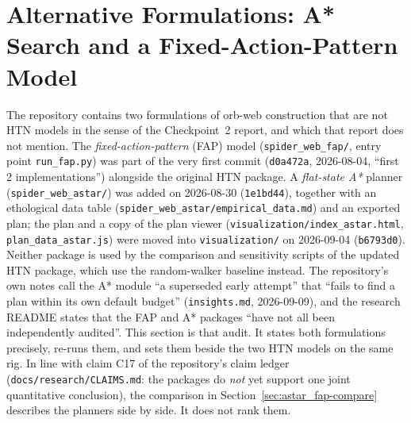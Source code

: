 \providecommand{\code}[1]{\texttt{#1}}

\section{Alternative Formulations: A* Search and a Fixed-Action-Pattern Model}
\label{sec:astar_fap}

The repository contains two formulations of orb-web construction that are not HTN models in the
sense of the Checkpoint~2 report, and which that report does not mention. The
\emph{fixed-action-pattern} (FAP) model (\code{spider\_web\_fap/\allowbreak{}}, entry point \code{run\_fap.py})
was part of the very first commit (\code{d0a472a}, 2026-08-04, ``first 2 implementations'')
alongside the original HTN package. A \emph{flat-state A*} planner (\code{spider\_web\_astar/\allowbreak{}})
was added on 2026-08-30 (\code{1e1bd44}), together with an ethological data table
(\code{spider\_web\_astar/\allowbreak{}empirical\_data.md}) and an exported plan; the plan and a copy of the plan
viewer (\code{visualization/\allowbreak{}index\_astar.html}, \code{plan\_data\_astar.js}) were moved into
\code{visualization/\allowbreak{}} on 2026-09-04 (\code{b6793d0}). Neither package is used by the comparison
and sensitivity scripts of the updated HTN package, which use the random-walker baseline instead.
The repository's own notes call the A* module ``a superseded early attempt'' that ``fails to find a
plan within its own default budget'' (\code{insights.md}, 2026-09-09), and the research README
states that the FAP and A* packages ``have not all been independently audited''. This section is
that audit. It states both formulations precisely, re-runs them, and sets them beside the two HTN
models on the same rig. In line with claim C17 of the repository's claim ledger
(\code{docs/\allowbreak{}research/\allowbreak{}CLAIMS.md}: the packages do \emph{not} yet support one joint quantitative
conclusion), the comparison in Section~\ref{sec:astar_fap-compare} describes the planners side by
side. It does not rank them.

